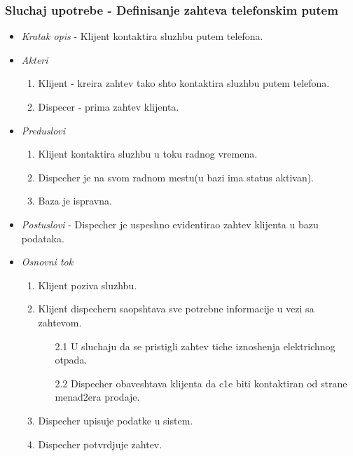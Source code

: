 \documentclass[10 pt]{article}
\begin{document}
	\subsubsection{Sluchaj upotrebe - Definisanje zahteva telefonskim putem}
	
		\begin{itemize}
			
			\item\textit{Kratak opis} - Klijent kontaktira sluzhbu putem telefona.

			
			\item\textit{Akteri} 
				\begin{enumerate}
					\item Klijent - kreira zahtev tako shto kontaktira sluzhbu putem telefona.
					\item Dispecer - prima zahtev klijenta.
				\end{enumerate}

			
			\item\textit{Preduslovi} 
				\begin{enumerate}
					\item Klijent kontaktira sluzhbu u toku  radnog vremena.
					\item Dispecher je na svom radnom mestu(u bazi ima status aktivan).

					\item Baza je ispravna.

				\end{enumerate}
			
			\item\textit{Postuslovi} - Dispecher je uspeshno evidentirao zahtev klijenta u bazu podataka.

			
			\item\textit{Osnovni tok}

				\begin{enumerate}
					\item Klijent poziva sluzhbu.
					\item Klijent dispecheru saopshtava sve potrebne informacije u vezi sa zahtevom.
						\begin{enumerate}
							\item[2.1] U sluchaju da se pristigli zahtev tiche iznoshenja elektrichnog otpada.
							\item[2.2] Dispecher obaveshtava klijenta da c1e biti kontaktiran od strane menad2era prodaje.
						\end{enumerate}
					\item Dispecher upisuje podatke u sistem.
					\item Dispecher potvrdjuje zahtev.
				\end{enumerate}
			

\end{itemize}
\end{document}
